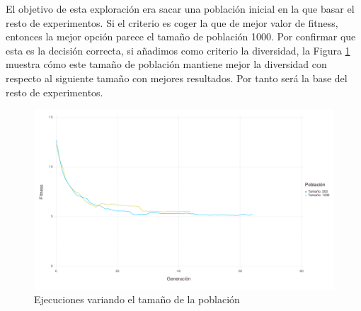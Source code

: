 El objetivo de esta exploración era sacar una población inicial en la que basar el resto de experimentos. Si el criterio
es coger la que de mejor valor de fitness, entonces la mejor opción parece el tamaño de población 1000. Por confirmar que
esta es la decisión correcta, si añadimos como criterio la diversidad, la Figura \ref{fig:population_size_variation_diversity}
muestra cómo este tamaño de población mantiene mejor la diversidad con respecto al siguiente tamaño con mejores 
resultados. Por tanto será la base del resto de experimentos.

\begin{figure}[]
	\centering	
	\includegraphics[scale=0.5]{figuras/population_size_variation_diversity.png}
	\caption{ Ejecuciones variando el tamaño de la población }
    \label{fig:population_size_variation_diversity}
\end{figure}
